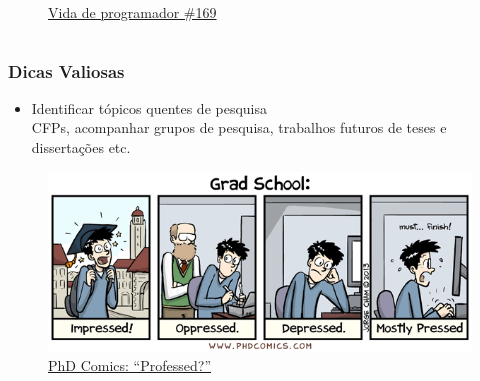 \begin{frame}
\begin{columns}
\begin{column}{0.5\linewidth}
\begin{figure}
                \caption{\href{https://developerslife.tech/pt/2011/07/12/voce-e-do-suporte/}{Vida de programador \#169}}
            \end{figure}
        \end{column}
    \end{columns}    
\end{frame}

\begin{frame}
    \frametitle{Dicas Valiosas}
        \begin{itemize}
            \item Identificar tópicos quentes de pesquisa \\
            \vspace{0.5cm}
            {\small CFPs, acompanhar grupos de pesquisa, trabalhos futuros de teses e dissertações etc.}
        \end{itemize}
        \begin{figure}
            \centering
            \includegraphics[width=\linewidth]{figs/phdcomics.png}
            \caption{\href{https://phdcomics.com/comics/archive_print.php?comicid=1672}{PhD Comics: ``Professed?''}}
        \end{figure}
\end{frame}

